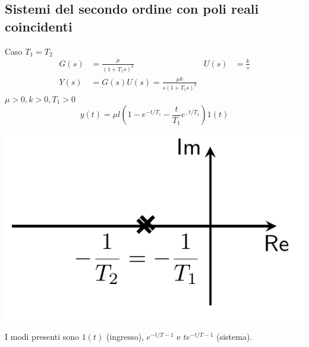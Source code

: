 \documentclass{article}
\numberwithin{equation}{subsection}
\let\oldsubsection\subsection%
\renewcommand{\subsection}{%
  \renewcommand{\theequation}{\thesubsection.\arabic{equation}}%
  \oldsubsection}%
\begin{document}
\subsection{Sistemi del secondo ordine con poli reali coincidenti}
Caso $T_1=T_2$
\begin{align*}
    G(s) &= \frac{\mu}{(1+T_1s)^2} & U(s) &= \frac{k}{s}\\
    Y(s) &= G(s)U(s) = \frac{\mu k}{s(1+T_1 s)^2}
\end{align*}
$\mu>0, k>0, T_1 >0$
\[
    y(t) = \mu l \left( 1- e^{-t/T_1} - \frac{t}{T_1}e^{_-t/T_1} \right) 1(t)
\]
\begin{center}
    \includegraphics[scale=0.23]{Images/Poli_reali_coincidenti.png}
\end{center}
I modi presenti sono $1(t)$ (ingresso), $e^{-t/T-1}$ e $t e^{-t/T-1}$ (sistema).
\end{document}
